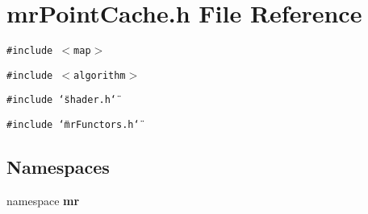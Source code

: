 \section{mr\-Point\-Cache.h File Reference}
\label{mrPointCache_8h}
{\tt \#include $<$map$>$}\par
{\tt \#include $<$algorithm$>$}\par
{\tt \#include \char`\"{}shader.h\char`\"{}}\par
{\tt \#include \char`\"{}mr\-Functors.h\char`\"{}}\par
\subsection*{Namespaces}
\begin{CompactItemize}
\item 
namespace {\bf mr}
\end{CompactItemize}
